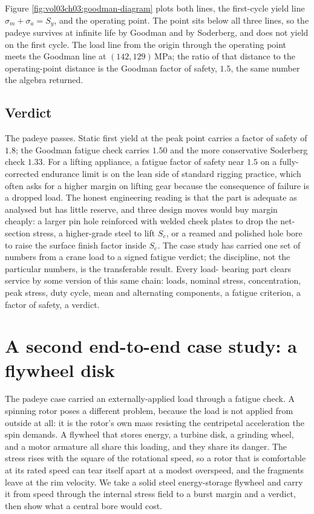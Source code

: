 

Figure \ref{fig:vol03ch03:goodman-diagram} plots both lines, the
first-cycle yield line $\sigma_m + \sigma_a = S_y$, and the operating
point. The point sits below all three lines, so the padeye survives at
infinite life by Goodman and by Soderberg, and does not yield on the
first cycle. The load line from the origin through the operating point
meets the Goodman line at $(142, 129)\,\text{MPa}$; the ratio of that
distance to the operating-point distance is the Goodman factor of
safety, $1.5$, the same number the algebra returned.

\subsection{Verdict}

The padeye passes. Static first yield at the peak point carries a
factor of safety of $1.8$; the Goodman fatigue check carries $1.50$ and
the more conservative Soderberg check $1.33$. For a lifting appliance, a
fatigue factor of safety near $1.5$ on a fully-corrected endurance limit
is on the lean side of standard rigging practice, which often asks for
a higher margin on lifting gear because the consequence of failure is a
dropped load. The honest engineering reading is that the part is
adequate as analysed but has little reserve, and three design moves
would buy margin cheaply: a larger pin hole reinforced with welded
cheek plates to drop the net-section stress, a higher-grade steel to
lift $S_e$, or a reamed and polished hole bore to raise the surface
finish factor inside $S_e$. The case study has carried one set of
numbers from a crane load to a signed fatigue verdict; the discipline,
not the particular numbers, is the transferable result. Every load-
bearing part clears service by some version of this same chain: loads,
nominal stress, concentration, peak stress, duty cycle, mean and
alternating components, a fatigue criterion, a factor of safety, a
verdict.

\section{A second end-to-end case study: a flywheel disk}

The padeye case carried an externally-applied load through a fatigue
check. A spinning rotor poses a different problem, because the load is
not applied from outside at all: it is the rotor's own mass resisting
the centripetal acceleration the spin demands. A flywheel that stores
energy, a turbine disk, a grinding wheel, and a motor armature all share
this loading, and they share its danger. The stress rises with the
square of the rotational speed, so a rotor that is comfortable at its
rated speed can tear itself apart at a modest overspeed, and the
fragments leave at the rim velocity. We take a solid steel energy-storage
flywheel and carry it from speed through the internal stress field to a
burst margin and a verdict, then show what a central bore would cost.


